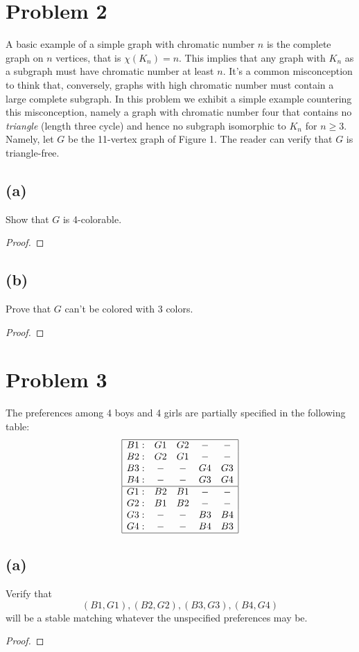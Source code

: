 \documentclass[14pt]{extarticle}
\begin{document}
\section{Problem 2}
A basic example of a simple graph with chromatic number $n$ is the complete graph on $n$ vertices, that is $\chi (K_n) = n$. This implies that any graph with $K_n$ as a subgraph must have chromatic number at least $n$. It’s a common misconception to think that, conversely, graphs with high chromatic number must contain a large complete subgraph. In this problem we exhibit a simple example countering this misconception, namely a graph with chromatic number four that contains no {\it triangle} (length three cycle) and hence no subgraph isomorphic to $K_n$ for $n \geq 3$. Namely, let $G$ be the 11-vertex graph of Figure 1. The reader can verify that $G$ is triangle-free.
\subsection{(a)}
Show that $G$ is 4-colorable.
\begin{proof}
\end{proof}
\subsection{(b)}
Prove that $G$ can't be colored with 3 colors.
\begin{proof}
\end{proof}

\section{Problem 3}
The preferences among 4 boys and 4 girls are partially specified in the following table:
$$
\begin{array}{|c c c c c|}
\hline
B1: & G1 & G2 & - & - \\
B2: & G2 & G1 & - & - \\
B3: & - & - & G4 & G3 \\
B4: & - & - & G3 & G4 \\
\hline 
G1: & B2 & B1 & - & - \\
G2: & B1 & B2 & - & - \\
G3: & - & - & B3 & B4 \\
G4: & - & - & B4 & B3 \\
\hline 
\end{array}
$$
\subsection{(a)}
Verify that
$$
(B1, G1), (B2, G2), (B3, G3), (B4, G4)
$$
will be a stable matching whatever the unspecified preferences may be.
\begin{proof}
\end{proof}
\end{document}
